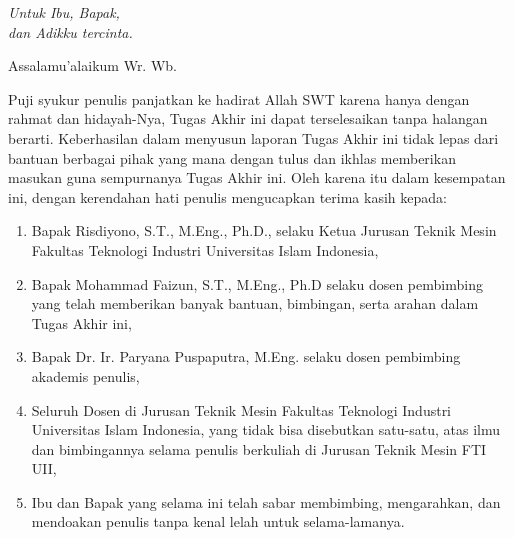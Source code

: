 \documentclass{TMUIITA}
\begin{document}
\cover

\approvalpage

\pengesahanpage


\acknowledgment
\begin{flushright}
\emph{Untuk Ibu, Bapak,\\dan Adikku tercinta.}
\end{flushright}
\mottopage
\preface
Assalamu'alaikum Wr. Wb.

\vspace{0.5cm}

Puji syukur penulis panjatkan ke hadirat Allah SWT karena hanya dengan rahmat dan hidayah-Nya, Tugas Akhir ini dapat terselesaikan tanpa halangan berarti. Keberhasilan dalam menyusun laporan Tugas Akhir ini tidak lepas dari bantuan berbagai pihak yang mana dengan tulus dan ikhlas memberikan masukan guna sempurnanya Tugas Akhir ini. Oleh karena itu dalam kesempatan ini, dengan kerendahan hati penulis mengucapkan terima kasih kepada:

\begin{enumerate}
\item{Bapak Risdiyono, S.T., M.Eng., Ph.D., selaku Ketua Jurusan Teknik Mesin  Fakultas Teknologi Industri Universitas Islam Indonesia,}
\item{Bapak Mohammad Faizun, S.T., M.Eng., Ph.D selaku dosen pembimbing yang telah memberikan banyak bantuan, bimbingan, serta arahan dalam Tugas Akhir ini,}

\item{Bapak Dr. Ir. Paryana Puspaputra, M.Eng. selaku dosen pembimbing akademis penulis,}
\item{Seluruh Dosen di Jurusan Teknik Mesin Fakultas Teknologi Industri Universitas Islam Indonesia, yang tidak bisa disebutkan satu-satu, atas ilmu dan bimbingannya selama penulis berkuliah di Jurusan Teknik Mesin FTI UII,}
\item{Ibu dan Bapak yang selama ini telah sabar membimbing, mengarahkan, dan mendoakan penulis tanpa kenal lelah untuk selama-lamanya.}

\end{enumerate}
\end{document}
